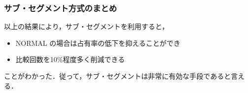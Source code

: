 \documentclass[twocolumn]{jsarticle}
\begin{document}
\subsubsection{サブ・セグメント方式のまとめ}
  以上の結果により，サブ・セグメントを利用すると，
  \begin{itemize}
    \item NORMAL の場合は占有率の低下を抑えることができ
    \item 比較回数を10\%程度多く削減できる
  \end{itemize}
  ことがわかった．従って，サブ・セグメントは非常に有効な手段であると言える．



  


\end{document}
